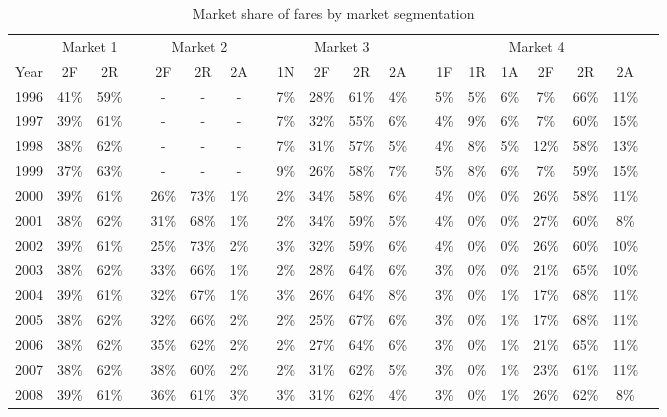 
\begin{table}[!ht] \centering 
  \caption{Market share of fares by market segmentation} 
  \label{tbl:mktshr} 
{\renewcommand\arraystretch{1.25}}
\begin{tabular} {cccccccccccccccccccc}
  \toprule
  &\multicolumn{2}{c}{Market 1} & & \multicolumn{3}{c}{Market 2} & & \multicolumn{4}{c}{Market 3} & & \multicolumn{6}{c}{Market 4} \\
 \cline{2-3} \cline{5-7} \cline{9-12} \cline{14-19} 
 Year & 2F  & 2R   & & 2F   & 2R   & 2A  & & 1N  & 2F   & 2R   & 2A   & & 1F & 1R & 1A & 2F & 2R & 2A \\ 
  \hline
1996 & 41\% & 59\% & & -    & -    & -   & & 7\% & 28\% & 61\% & 4\%  & & 5\% & 5\% & 6\% & 7\%  & 66\% & 11\% \\ 
1997 & 39\% & 61\% & & -    & -    & -   & & 7\% & 32\% & 55\% & 6\%  & & 4\% & 9\% & 6\% & 7\%  & 60\% & 15\% \\ 
1998 & 38\% & 62\% & & -    & -    & -   & & 7\% & 31\% & 57\% & 5\%  & & 4\% & 8\% & 5\% & 12\% & 58\% & 13\% \\ 
1999 & 37\% & 63\% & & -    & -    & -   & & 9\% & 26\% & 58\% & 7\%  & & 5\% & 8\% & 6\% & 7\%  & 59\% & 15\% \\ 
2000 & 39\% & 61\% & & 26\% & 73\% & 1\% & & 2\% & 34\% & 58\% & 6\%  & & 4\% & 0\% & 0\% & 26\% & 58\% & 11\% \\ 
2001 & 38\% & 62\% & & 31\% & 68\% & 1\% & & 2\% & 34\% & 59\% & 5\%  & & 4\% & 0\% & 0\% & 27\% & 60\% &  8\% \\ 
2002 & 39\% & 61\% & & 25\% & 73\% & 2\% & & 3\% & 32\% & 59\% & 6\%  & & 4\% & 0\% & 0\% & 26\% & 60\% & 10\% \\ 
2003 & 38\% & 62\% & & 33\% & 66\% & 1\% & & 2\% & 28\% & 64\% & 6\%  & & 3\% & 0\% & 0\% & 21\% & 65\% & 10\% \\ 
2004 & 39\% & 61\% & & 32\% & 67\% & 1\% & & 3\% & 26\% & 64\% & 8\%  & & 3\% & 0\% & 1\% & 17\% & 68\% & 11\% \\ 
2005 & 38\% & 62\% & & 32\% & 66\% & 2\% & & 2\% & 25\% & 67\% & 6\%  & & 3\% & 0\% & 1\% & 17\% & 68\% & 11\% \\ 
2006 & 38\% & 62\% & & 35\% & 62\% & 2\% & & 2\% & 27\% & 64\% & 6\%  & & 3\% & 0\% & 1\% & 21\% & 65\% & 11\% \\ 
2007 & 38\% & 62\% & & 38\% & 60\% & 2\% & & 2\% & 31\% & 62\% & 5\%  & & 3\% & 0\% & 1\% & 23\% & 61\% & 11\% \\ 
2008 & 39\% & 61\% & & 36\% & 61\% & 3\% & & 3\% & 31\% & 62\% & 4\%  & & 3\% & 0\% & 1\% & 26\% & 62\% &  8\% \\ 

\end{tabular}
\end{table}
